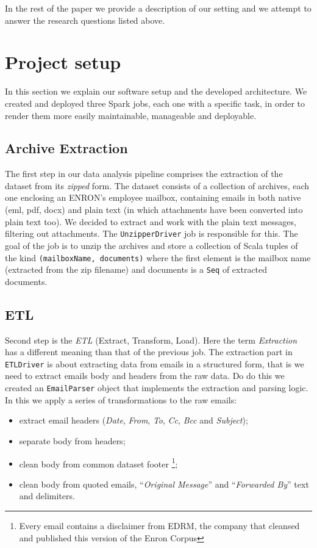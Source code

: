 \documentclass{vldb}
\begin{document}
In the rest of the paper we provide a description of our setting and we attempt to answer the research questions listed above.


\section{Project setup}
\label{sec:p-s}
In this section we explain our software setup and the developed architecture.
We created and deployed three Spark jobs, each one with a specific task, in
order to render them more easily maintainable, manageable and deployable.

\subsection{Archive Extraction}
\label{sub-sec:archive-extraction}
The first step in our data analysis pipeline comprises the extraction of the
dataset from its \textit{zipped} form. The dataset consists of a collection of
archives, each one enclosing an ENRON's employee mailbox, containing emails in
both native (eml, pdf, docx) and plain text (in which attachments have been
converted into plain text too). We decided to extract and work with the plain
text messages, filtering out attachments. The \texttt{UnzipperDriver} job is
responsible for this. The goal of the job is to unzip the archives and store a
collection of Scala tuples of the kind \texttt{(mailboxName, documents)} where
the first element is the mailbox name (extracted from the zip filename) and
documents is a \texttt{Seq} of extracted documents.

\subsection{ETL}
\label{sub-sec:etl}
Second step is the \textit{ETL} (Extract, Transform, Load). Here the term
\textit{Extraction} has a different meaning than that of the previous job.
The extraction part in \texttt{ETLDriver} is about extracting data from emails
in a structured form, that is we need to extract emails body and headers from
the raw data. Do do this we created an \texttt{EmailParser} object that
implements the extraction and parsing logic. In this we apply a series of
transformations to the raw emails:
\begin{itemize}
	\item extract email headers (\textit{Date}, \textit{From}, \textit{To},
		\textit{Cc}, \textit{Bcc} and \textit{Subject});
	\item separate body from headers;
	\item clean body from common dataset footer \footnote{Every email contains a
		disclaimer from EDRM, the company that cleansed and published this
		version of the Enron Corpus};
	\item clean body from quoted emails, ``\textit{Original Message}'' and
		``\textit{Forwarded By}'' text and delimiters.
\end{itemize}
\end{document}
